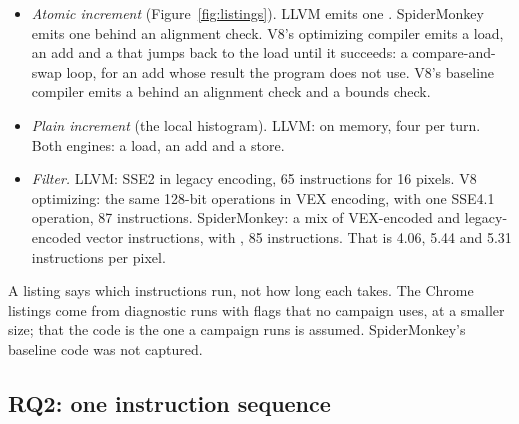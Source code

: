\begin{itemize}[leftmargin=1.5em]
\item \emph{Atomic increment} (Figure~\ref{fig:listings}). LLVM emits one
. SpiderMonkey emits one  behind an alignment
check. V8's optimizing compiler emits a load, an add and a  that jumps back to the load until it succeeds: a compare-and-swap
loop, for an add whose result the program does not use. V8's baseline
compiler emits a  behind an alignment check and a bounds
check.
\item \emph{Plain increment} (the local histogram). LLVM:  on
memory, four per turn. Both engines: a load, an add and a store.
\item \emph{Filter.} LLVM: SSE2 in legacy encoding, 65 instructions for 16
pixels. V8 optimizing: the same 128-bit operations in VEX encoding, with one
SSE4.1 operation, 87 instructions. SpiderMonkey: a mix of VEX-encoded and
legacy-encoded vector instructions, with , 85 instructions.
That is 4.06, 5.44 and 5.31 instructions per pixel.
\end{itemize}
A listing says which instructions run, not how long each takes. The Chrome
listings come from diagnostic runs with flags that no campaign uses, at a
smaller size; that the code is the one a campaign runs is assumed.
SpiderMonkey's baseline code was not captured.

\subsection{RQ2: one instruction sequence}
\label{sec:why-rq2}

